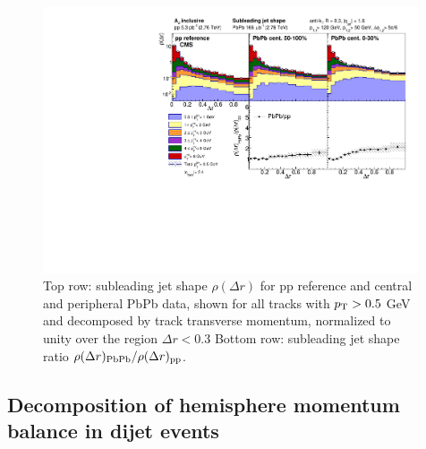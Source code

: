 \begin{figure}[h!]
\begin{center} 
\includegraphics[width=0.99\textwidth]{figures/Results/JetShapes_SubLeading_WithHighpT_PAS.pdf}
\caption[Subleading jet shape at 2.76 TeV, shown differentially in $p_{\rm T}^{\rm trk}$]{Top row:  subleading jet shape $\rho(\Delta r)$ for pp reference and central and peripheral PbPb data, shown for all tracks with $p_{\rm T}> 0.5$ GeV and decomposed by track transverse momentum, normalized to unity over the region $\Delta r<0.3$ Bottom row:  subleading jet shape ratio $\rho(\Delta r)_{\rm PbPb}/\rho(\Delta r)_{\rm pp}$. }
\label{fig:JetShape_SubLeading} 
\end{center} 
\end{figure} 



\clearpage



\subsection{Decomposition of hemisphere momentum balance in dijet events}
\label{sec:dijet_mpt}

